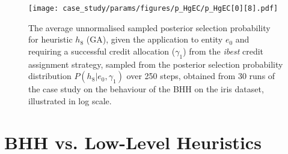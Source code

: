 \begin{figure}[htpb]
	\centering
	\texttt{[image: case\_study/params/figures/p\_HgEC/p\_HgEC[0][8].pdf]}
	\caption{The average unnormalised sampled posterior selection probability for heuristic $h_{8}$ (\acs{GA}), given the application to entity $e_{0}$ and requiring a successful credit allocation ($\gamma_{1}$) from the \textit{ibest} credit assignment strategy, sampled from the posterior selection probability distribution $P(h_{8} \vert e_{0}, \gamma_{1})$ over 250 steps, obtained from 30 runs of the case study on the behaviour of the \acs{BHH} on the iris dataset, illustrated in log scale.}
	\label{fig:results:case_study:p_HgEC:0:8}
\end{figure}

\section{BHH vs. Low-Level Heuristics}\label{sec:results:standalone}

